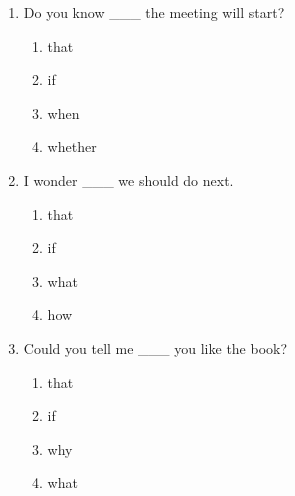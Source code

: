 \documentclass[11pt,a4paper]{ctexart}
\begin{document}
\begin{enumerate}[leftmargin=*,itemsep=4pt]
\begin{enumerate}[label=\Alph*.,leftmargin=2em,itemsep=1pt,topsep=2pt]
\end{enumerate}
\item Do you know \_\_\_ the meeting will start?
\begin{enumerate}[label=\Alph*.,leftmargin=2em,itemsep=1pt,topsep=2pt]
\item that
\item if
\item when
\item whether
\end{enumerate}
\item I wonder \_\_\_ we should do next.
\begin{enumerate}[label=\Alph*.,leftmargin=2em,itemsep=1pt,topsep=2pt]
\item that
\item if
\item what
\item how
\end{enumerate}
\item Could you tell me \_\_\_ you like the book?
\begin{enumerate}[label=\Alph*.,leftmargin=2em,itemsep=1pt,topsep=2pt]
\item that
\item if
\item why
\item what
\end{enumerate}
\end{enumerate}
\end{document}
